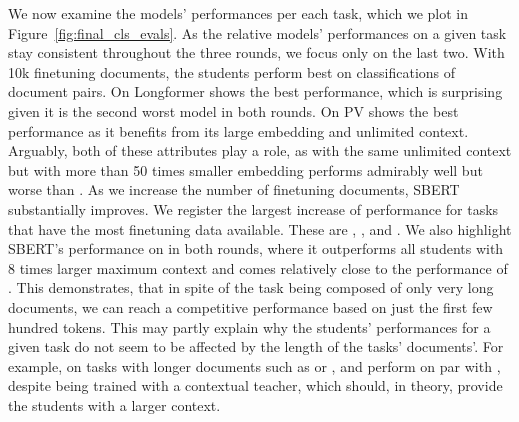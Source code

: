We now examine the models' performances per each task, which we plot in
Figure~\ref{fig:final_cls_evals}. As the relative models' performances on a
given task stay consistent throughout the three rounds, we focus only on the
last two. With 10k finetuning documents, the students perform best on
classifications of document pairs. On  Longformer shows the best
performance, which is surprising given it is the second worst model in both
rounds. On  PV shows the best performance as it benefits from its
large embedding and unlimited context. Arguably, both of these attributes play
a role, as  with the same unlimited context but with more than 50
times smaller embedding performs admirably well but worse than . As
we increase the number of finetuning documents, SBERT substantially improves.
We register the largest increase of performance for tasks that have the most
finetuning data available. These are , , and .
We also highlight SBERT's performance on  in both rounds, where it
outperforms all students with 8 times larger maximum context and comes
relatively close to the performance of . This demonstrates, that in
spite of the task being composed of only very long documents, we can reach a
competitive performance based on just the first few hundred tokens. This may
partly explain why the students' performances for a given task do not seem to
be affected by the length of the tasks' documents'. For example, on tasks with
longer documents such as  or , {\CosineStudent} and
{\MSEStudent} perform on par with {\OnlyMSEStudent}, despite being trained with
a contextual teacher, which should, in theory, provide the students with a
larger context.





